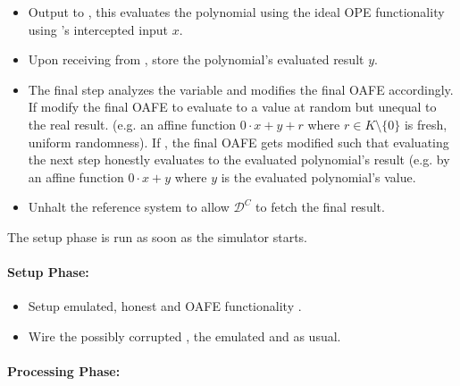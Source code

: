 \begin{itemize}

  \item Output  to \JWfuncSymOPEnp{}, this evaluates the
    polynomial using the ideal OPE functionality using \JWpTwo{}'s intercepted
    input $x$.

  \item Upon receiving  from \JWfuncSymOPEnp{}, store
    the polynomial's evaluated result $y$.

  \item The final step analyzes the variable  and modifies the
    final OAFE accordingly. If  modify the final OAFE
    to evaluate to a value at random but unequal to the real result. (e.g. an
    affine function $0 \cdot x + y + r$ where $r \in K \setminus \{0\}$ is
    fresh, uniform randomness). If , the final OAFE
    gets modified such that evaluating the next step honestly evaluates to the
    evaluated polynomial's result (e.g. by an affine function $0 \cdot x + y$
    where $y$ is the evaluated polynomial's value.

  \item Unhalt the reference system to allow $\mathcal{D}^C$ to fetch the final
    result.

\end{itemize}


\label{sec:simulator-goliath}

The setup phase is run as soon as the simulator starts.

\paragraph{Setup Phase:}

\begin{itemize}

  \item Setup emulated, honest \JWpTwo{} and OAFE functionality
    \JWfuncSymOAFE{}.

  \item Wire the possibly corrupted \JWpOne{}, the emulated \JWpTwo{} and
    \JWfuncSymOAFE{} as usual.

\end{itemize}

\paragraph{Processing Phase:}

